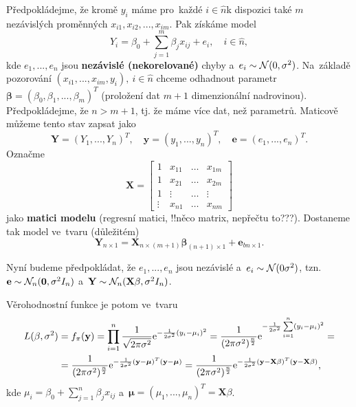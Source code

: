 Předpokládejme, že kromě $y_i$ máme pro~každé $i\in\hat{n}$k dispozici také $m$ nezávislých proměnných $x_{i1},x_{i2},...,x_{im}$. Pak získáme model
$$ Y_i=\beta_0+\sum_{j=1}^m \beta_j x_{ij}+e_i,\quad i\in\hat{n},$$
kde $e_1,...,e_n$ jsou \textbf{nezávislé (nekorelované)} chyby a~$e_i\sim\mathcal{N}(0,\sigma^2)$. Na~základě pozorování $(x_{i1},...,x_{im},y_i),~i\in\hat{n}$ chceme odhadnout parametr $\boldsymbol{\beta}=(\beta_0,\beta_1,...,\beta_m)^T$ (proložení dat $m+1$ dimenzionální nadrovinou). Předpokládejme, že $n>m+1$, tj. že máme více dat, než parametrů. Maticově můžeme tento stav zapsat jako
$$ \textbf{Y}=(Y_1,...,Y_n)^T,\quad \textbf{y}=(y_1,...,y_n)^T,\quad \textbf{e}=(e_1,...,e_n)^T.$$
Označme 
$$ \textbf{X}=\left[ \begin{array}{cccc}
1 & x_{11} & \dots & x_{1m} \\
1 & x_{21} & \dots & x_{2m} \\
1 & \vdots & \dots & \vdots \\
 \vdots& x_{n1} & \dots & x_{nm} 
\end{array}
 \right]$$ jako \textbf{matici modelu} (regresní matici, !!něco matrix, nepřečtu to???). Dostaneme tak model ve~tvaru (důležitém)
  \begin{equation}\label{the_chosen_one}
 \textbf{Y}_{n\times 1}=\textbf{X}_{n\times(m+1)}\boldsymbol{\beta}_{(n+1)\times 1}+\textbf{e}_{bn\times 1}.
 \end{equation}
 
 Nyní budeme předpokládat, že $e_1,...,e_n$ jsou nezávislé a~$e_i \sim\mathcal{N}(0\sigma^2)$, tzn. $\textbf{e}\sim\mathcal{N}_n(\textbf{0},\sigma^2 I_n)$ a~$\textbf{Y}\sim\mathcal{N}_n(\textbf{X}\beta,\sigma^2 I_n)$. 
 
 Věrohodnostní funkce je potom ve~tvaru 
 \[
 \begin{split}
 L(\beta,\sigma^2)&=f_\pi(\textbf{y})=\prod_{i=1}^n \frac{1}{\sqrt{2\pi\sigma^2}}\mathrm{e}^{-\frac{1}{2\sigma^2}(y_i-\mu_i)^2}=\frac{1}{(2\pi\sigma^2)^{\frac{n}{2}}}\mathrm{e}^{-\frac{1}{2\sigma^2}\sum\limits_{i=1}^{n} (y_i-\mu_i)^2}= \\ &=\frac{1}{(2\pi\sigma^2)^{\frac{n}{2}}}\mathrm{e}^{-\frac{1}{2\sigma^2}(\textbf{y}-\boldsymbol{\mu})^T(\textbf{y}-\boldsymbol{\mu})}=\frac{1}{(2\pi\sigma^2)^{\frac{n}{2}}}\mathrm{e}^{-\frac{1}{2\sigma^2}(\textbf{y}-\textbf{X}\beta)^T(\textbf{y}-\textbf{X}\beta)},
 \end{split}
 \] kde $\mu_i=\beta_0+\sum_{j=1}^n \beta_j x_{ij}$ a~$\boldsymbol{\mu}=(\mu_1,...,\mu_n)^T=\textbf{X}\beta$.
 
